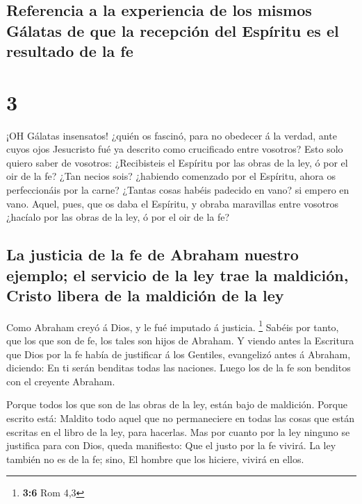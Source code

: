 \hypertarget{referencia-a-la-experiencia-de-los-mismos-guxe1latas-de-que-la-recepciuxf3n-del-espuxedritu-es-el-resultado-de-la-fe}{%
\subsection{Referencia a la experiencia de los mismos Gálatas de que la
recepción del Espíritu es el resultado de la
fe}\label{referencia-a-la-experiencia-de-los-mismos-guxe1latas-de-que-la-recepciuxf3n-del-espuxedritu-es-el-resultado-de-la-fe}}

\hypertarget{section-2}{%
\section{3}\label{section-2}}

 ¡OH Gálatas insensatos! ¿quién os fascinó, para no obedecer
á la verdad, ante cuyos ojos Jesucristo fué ya descrito como crucificado
entre vosotros?  Esto solo quiero saber de vosotros:
¿Recibisteis el Espíritu por las obras de la ley, ó por el oir de la fe?
 ¿Tan necios sois? ¿habiendo comenzado por el Espíritu,
ahora os perfeccionáis por la carne?  ¿Tantas cosas habéis
padecido en vano? si empero en vano.  Aquel, pues, que os
daba el Espíritu, y obraba maravillas entre vosotros ¿hacíalo por las
obras de la ley, ó por el oir de la fe?

\hypertarget{la-justicia-de-la-fe-de-abraham-nuestro-ejemplo-el-servicio-de-la-ley-trae-la-maldiciuxf3n-cristo-libera-de-la-maldiciuxf3n-de-la-ley}{%
\subsection{La justicia de la fe de Abraham nuestro ejemplo; el servicio
de la ley trae la maldición, Cristo libera de la maldición de la
ley}\label{la-justicia-de-la-fe-de-abraham-nuestro-ejemplo-el-servicio-de-la-ley-trae-la-maldiciuxf3n-cristo-libera-de-la-maldiciuxf3n-de-la-ley}}

 Como Abraham creyó á Dios, y le fué imputado á justicia.
\footnote{\textbf{3:6} Rom 4,3}  Sabéis por tanto, que los
que son de fe, los tales son hijos de Abraham.  Y viendo
antes la Escritura que Dios por la fe había de justificar á los
Gentiles, evangelizó antes á Abraham, diciendo: En ti serán benditas
todas las naciones.  Luego los de la fe son benditos con el
creyente Abraham.

 Porque todos los que son de las obras de la ley, están
bajo de maldición. Porque escrito está: Maldito todo aquel que no
permaneciere en todas las cosas que están escritas en el libro de la
ley, para hacerlas.  Mas por cuanto por la ley ninguno se
justifica para con Dios, queda manifiesto: Que el justo por la fe
vivirá.  La ley también no es de la fe; sino, El hombre que
los hiciere, vivirá en ellos.

